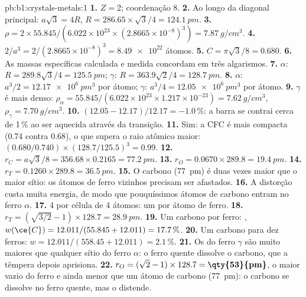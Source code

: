 \begin{solution}{pb:b1:crystals-metals:1}
\textbf{1.} $Z = 2$; coordenação 8.
\textbf{2.} Ao longo da diagonal principal: $a\sqrt3 = 4R$, $R = 286.65 \times
\sqrt3/4 = \qty{124.1}{pm}$.
\textbf{3.} $\rho = 2 \times 55.845/(6.022 \times 10^{23} \times (2.8665
\times 10^{-8})^3) = \qty{7.87}{g/cm^3}$.
\textbf{4.} $2/a^3 = 2/(2.8665 \times 10^{-8})^3 = \num{8.49e22}$ átomos.
\textbf{5.} $C = \pi\sqrt3/8 = 0.680$.
\textbf{6.} As massas específicas calculada e medida concordam em três
algarismos.
\textbf{7.} $\alpha$: $R = 289.8\sqrt3/4 = \qty{125.5}{pm}$; $\gamma$:
$R = 363.9\sqrt2/4 = \qty{128.7}{pm}$.
\textbf{8.} $\alpha$: $a^3/2 = \qty{12.17e6}{pm^3}$ por átomo; $\gamma$:
$a^3/4 = \qty{12.05e6}{pm^3}$ por átomo.
\textbf{9.} $\gamma$ é mais denso: $\rho_\alpha = 55.845/(6.022 \times 10^{23}
\times 1.217 \times 10^{-23}) = \qty{7.62}{g/cm^3}$, $\rho_\gamma =
\qty{7.70}{g/cm^3}$.
\textbf{10.} $(12.05 - 12.17)/12.17 = -1.0\,\%$: a barra se contrai cerca
de 1\,\% ao ser aquecida através da transição.
\textbf{11.} Sim: a CFC é mais compacta (0.74 contra 0.68), o que supera o
raio atômico maior: $(0.680/0.740) \times (128.7/125.5)^3 = 0.99$.
\textbf{12.} $r_C = a\sqrt3/8 = 356.68 \times 0.2165 = \qty{77.2}{pm}$.
\textbf{13.} $r_O = 0.0670 \times 289.8 = \qty{19.4}{pm}$.
\textbf{14.} $r_T = 0.1260 \times 289.8 = \qty{36.5}{pm}$.
\textbf{15.} O carbono (\qty{77}{pm}) é duas vezes maior que o maior
sítio: os átomos de ferro vizinhos precisam ser afastados.
\textbf{16.} A distorção custa muita energia, de modo que pouquíssimos
átomos de carbono entram no ferro $\alpha$.
\textbf{17.} 4  por célula de 4 átomos: um por átomo
de ferro.
\textbf{18.} $r_T = (\sqrt{3/2} - 1) \times 128.7 = \qty{28.9}{pm}$.
\textbf{19.} Um carbono por ferro: , $w(\ce{C}) = 12.011/(55.845 +
12.011) = 17.7\,\%$.
\textbf{20.} Um carbono para dez ferros: $w = 12.011/(558.45 + 12.011) =
2.1\,\%$.
\textbf{21.} Os  do ferro $\gamma$ são muito maiores que
qualquer sítio do ferro $\alpha$: o ferro quente dissolve o carbono, que a
têmpera depois aprisiona.
\textbf{22.} $r_O = (\sqrt2 - 1) \times 128.7 = \textbf{\qty{53}{pm}}$, o
maior vazio do ferro e ainda menor que um átomo de carbono (\qty{77}{pm}):
o carbono se dissolve no ferro quente, mas o distende.
\end{solution}
